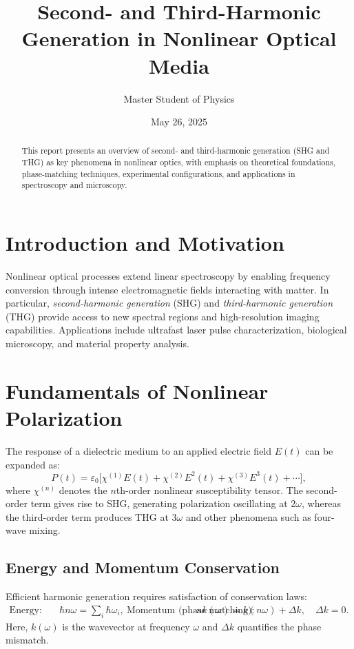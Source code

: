 \documentclass[12pt,a4paper]{article}
\title{Second- and Third-Harmonic Generation in Nonlinear Optical Media}
\author{Master Student of Physics}
\date{May 26, 2025}
\begin{document}
\maketitle

\begin{abstract}
This report presents an overview of second- and third-harmonic generation (SHG and THG) as key phenomena in nonlinear optics, with emphasis on theoretical foundations, phase-matching techniques, experimental configurations, and applications in spectroscopy and microscopy.
\end{abstract}

\section{Introduction and Motivation}
Nonlinear optical processes extend linear spectroscopy by enabling frequency conversion through intense electromagnetic fields interacting with matter. In particular, \emph{second-harmonic generation} (SHG) and \emph{third-harmonic generation} (THG) provide access to new spectral regions and high-resolution imaging capabilities. Applications include ultrafast laser pulse characterization, biological microscopy, and material property analysis.

\section{Fundamentals of Nonlinear Polarization}
The response of a dielectric medium to an applied electric field $E(t)$ can be expanded as:
\begin{equation}
P(t) = \varepsilon_0\bigl[\chi^{(1)}E(t) + \chi^{(2)}E^2(t) + \chi^{(3)}E^3(t) + \cdots\bigr],
\end{equation}
where $\chi^{(n)}$ denotes the $n$th-order nonlinear susceptibility tensor. The second-order term gives rise to SHG, generating polarization oscillating at $2\omega$, whereas the third-order term produces THG at $3\omega$ and other phenomena such as four-wave mixing.

\subsection{Energy and Momentum Conservation}
Efficient harmonic generation requires satisfaction of conservation laws:
\begin{align}
\text{Energy:} &\quad \hbar n\omega = \sum_i \hbar \omega_i, \
\text{Momentum (phase matching):} &\quad n k(\omega) = k(n\omega) + \Delta k, \quad \Delta k = 0.
\end{align}
Here, $k(\omega)$ is the wavevector at frequency $\omega$ and $\Delta k$ quantifies the phase mismatch.
\end{document}
